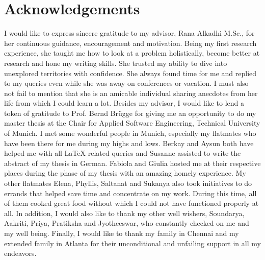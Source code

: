 \documentclass[a4paper,12pt,twoside]{report}
\begin{document}
\chapter*{Acknowledgements}
I would like to express sincere gratitude to my advisor, Rana Alkadhi M.Sc., for her continuous guidance, encouragement and motivation. Being my first research experience, she taught me how to look at a problem holistically, become better at research and hone my writing skills. She trusted my ability to dive into unexplored territories with confidence. She always found time for me and replied to my queries even while she was away on conferences or vacation. I must also not fail to mention that she is an amicable individual sharing anecdotes from her life from which I could learn a lot.
\newline \newline
Besides my advisor, I would like to lend a token of gratitude to Prof. Bernd Brügge for giving me an opportunity to do my master thesis at the Chair for Applied Software Engineering, Technical University of Munich. 
\newline \newline
I met some wonderful people in Munich, especially my flatmates who have been there for me during my highs and lows. Berkay and Aysun both have helped me with all LaTeX related queries and Susanne assisted to write the abstract of my thesis in German. Fabiola and Giulia hosted me at their respective places during the phase of my thesis with an amazing homely experience. My other flatmates Elena, Phyllis, Saltanat and Sukanya also took initiatives to do errands that helped save time and concentrate on my work. During this time, all of them cooked great food without which I could not have functioned properly at all. In addition, I would also like to thank my other well wishers, Soundarya, Aakriti, Priya, Pratiksha and Jyotheeswar, who constantly checked on me and my well being.
\newline \newline
Finally, I would like to thank my family in Chennai and my extended family in Atlanta for their unconditional and unfailing support in all my endeavors. 

\end{document}
